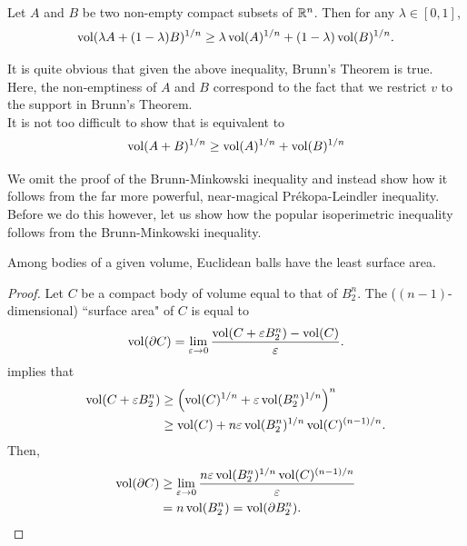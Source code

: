 \begin{ftheo}
\label{brunn minkowski inequality}
Let $A$ and $B$ be two non-empty compact subsets of $\mathbb{R}^n$. Then for any $\lambda\in[0,1]$,
\begin{equation}
\label{eqn brunn minkowski inequality}
    \operatorname{vol}(\lambda A + (1-\lambda) B)^{1/n} \geq \lambda\operatorname{vol}(A)^{1/n} + (1-\lambda)\operatorname{vol}(B)^{1/n}.
\end{equation}
\end{ftheo}
It is quite obvious that given the above inequality, Brunn's Theorem is true. Here, the non-emptiness of $A$ and $B$ correspond to the fact that we restrict $v$ to the support in Brunn's Theorem.\\

It is not too difficult to show that  is equivalent to
\begin{equation}
\label{eqn brunn minkowski inequality alt no lambda}
    \operatorname{vol}(A+B)^{1/n} \geq \operatorname{vol}(A)^{1/n} + \operatorname{vol}(B)^{1/n}
\end{equation}

We omit the proof of the Brunn-Minkowski inequality and instead show how it follows from the far more powerful, near-magical Pr\'{e}kopa-Leindler inequality.\\
Before we do this however, let us show how the popular isoperimetric inequality follows from the Brunn-Minkowski inequality.

\begin{theorem}
\label{isoperimetric inequality}
Among bodies of a given volume, Euclidean balls have the least surface area.
\end{theorem}
\begin{proof}
Let $C$ be a compact body of volume equal to that of $B_2^n$. The ($(n-1)$-dimensional) ``surface area" of $C$ is equal to
\[ \operatorname{vol}(\partial C) = \lim_{\varepsilon\to 0} \frac{\operatorname{vol}(C + \varepsilon B_2^n) - \operatorname{vol}(C)}{\varepsilon}. \]
 implies that
\begin{align*}
    \operatorname{vol}(C+\varepsilon B_2^n) &\geq \left(\operatorname{vol}(C)^{1/n} + \varepsilon\operatorname{vol}(B_2^n)^{1/n}\right)^{n} \\
    &\geq \operatorname{vol}(C) + n\varepsilon\operatorname{vol}(B_2^n)^{1/n}\operatorname{vol}(C)^{(n-1)/n}.
\end{align*}
Then,
\begin{align*}
    \operatorname{vol}(\partial C) &\geq \lim_{\varepsilon\to 0} \frac{n\varepsilon\operatorname{vol}(B_2^n)^{1/n}\operatorname{vol}(C)^{(n-1)/n}}{\varepsilon}\\
    &= n\operatorname{vol}(B_2^n) = \operatorname{vol}(\partial B_2^n).\qedhere
\end{align*}
\end{proof}

